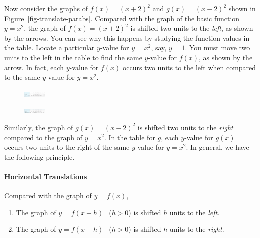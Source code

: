 \documentclass[10pt,]{book}
\theoremstyle{plain}
\theoremstyle{definition}
\theoremstyle{definition}
\numberwithin{equation}{section}
\newcommand{\gt}{ > }
\begin{document}
    Now consider the graphs of \(f (x) = (x + 2)^2\) and \(g(x) = (x − 2)^2\) shown in \hyperref[fig-translate-parabs]{Figure~\ref{fig-translate-parabs}}. Compared with the graph of the basic function \(y = x^2\), the graph of \(f (x) = (x + 2)^2\) is shifted two units to the \emph{left}, as shown by the arrows. You can see why this happens by studying the function values in the table. Locate a particular \(y\)-value for \(y = x^2\), say, \(y = 1\). You must move two units to the left in the table to find the same \(y\)-value for \(f (x)\), as shown by the arrow. In fact, each \(y\)-value for \(f (x)\) occurs two units to the left when compared to the same \(y\)-value for \(y = x^2\).
    \leavevmode%
\begin{figure}
\centering
\includegraphics[width=0.100\textwidth,]{images/fig-table-translate-left.svg}\caption{\label{fig-table-translate-left}}
\end{figure}

%
\par

    \leavevmode%
\begin{figure}
\centering
\includegraphics[width=0.100\textwidth,]{images/fig-table-translate-right.svg}\caption{\label{fig-table-translate-right}}
\end{figure}

    Similarly, the graph of \(g(x) = (x − 2)^2\) is shifted two units to the \emph{right} compared to the graph of \(y = x^2\). In the table for \(g\), each \(y\)-value for \(g(x)\) occurs two units to the right of the same \(y\)-value for \(y = x^2\). In general, we have the following principle.
%
\typeout{************************************************}
\typeout{************************************************}
\paragraph[Horizontal Translations]{Horizontal Translations}\label{paragraphs-27}
%
\par

    Compared with the graph of \(y = f (x)\),
    \leavevmode%
\begin{enumerate}
\item\hypertarget{li-294}{}The graph of \(y = f (x + h)~ ~\) (\(h \gt 0\)) is shifted \(h\) units to the \emph{left}.\item\hypertarget{li-295}{}The graph of \(y = f (x − h)~ ~\) (\(h \gt 0\)) is shifted \(h\) units to the \emph{right}.\end{enumerate}
\end{document}
